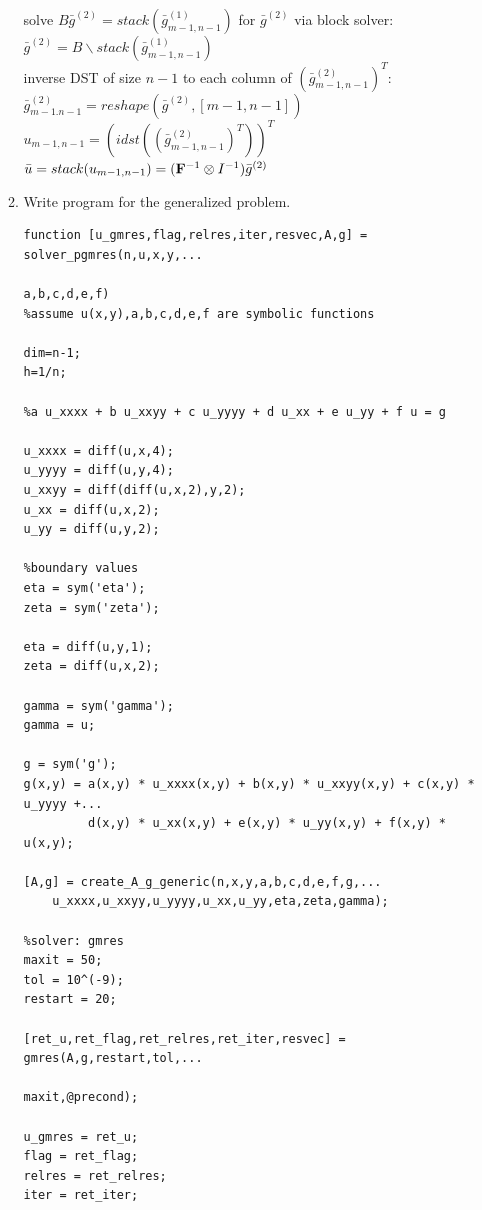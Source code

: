 \documentclass[12pt,letter]{article}
\begin{document}
\begin{enumerate}
\begin{enumerate}
  solve $B \bar{g}^{(2)} = stack(\bar{g}_{m-1,n-1}^{(1)})$ for $\bar{g}^{(2)}$ via block solver:\\
  $\bar{g}^{(2)}=B \backslash stack(\bar{g}_{m-1,n-1}^{(1)})$\\
  
  inverse DST of size $n-1$ to each column of $(\bar{g}_{m-1,n-1}^{(2)})^T$:\\
  $\bar{g}_{m-1.n-1}^{(2)}=reshape(\bar{g}^{(2)},[m-1,n-1])$\\
  $u_{m-1,n-1}=(idst((\bar{g}_{m-1,n-1}^{(2)})^T))^T$\\
  $\bar{u}=stack(u_{m-1,n-1})=(\bold{F}^{-1} \otimes I^{-1}) \bar{g}^{(2)}$\\

  \pagebreak
  
\item Write program for the generalized problem.\\

\begin{verbatim}
function [u_gmres,flag,relres,iter,resvec,A,g] = solver_pgmres(n,u,x,y,...
                                                     a,b,c,d,e,f)
%assume u(x,y),a,b,c,d,e,f are symbolic functions

dim=n-1;
h=1/n;

%a u_xxxx + b u_xxyy + c u_yyyy + d u_xx + e u_yy + f u = g

u_xxxx = diff(u,x,4);
u_yyyy = diff(u,y,4);
u_xxyy = diff(diff(u,x,2),y,2);
u_xx = diff(u,x,2);
u_yy = diff(u,y,2);

%boundary values
eta = sym('eta');
zeta = sym('zeta');

eta = diff(u,y,1);
zeta = diff(u,x,2);

gamma = sym('gamma');
gamma = u;

g = sym('g');
g(x,y) = a(x,y) * u_xxxx(x,y) + b(x,y) * u_xxyy(x,y) + c(x,y) * u_yyyy +...
         d(x,y) * u_xx(x,y) + e(x,y) * u_yy(x,y) + f(x,y) * u(x,y);

[A,g] = create_A_g_generic(n,x,y,a,b,c,d,e,f,g,...
    u_xxxx,u_xxyy,u_yyyy,u_xx,u_yy,eta,zeta,gamma);

%solver: gmres
maxit = 50;
tol = 10^(-9);
restart = 20;

[ret_u,ret_flag,ret_relres,ret_iter,resvec] = gmres(A,g,restart,tol,...
                                                    maxit,@precond);

u_gmres = ret_u;
flag = ret_flag;
relres = ret_relres;
iter = ret_iter;


\end{verbatim}
\end{enumerate}
\end{enumerate}
\end{document}

